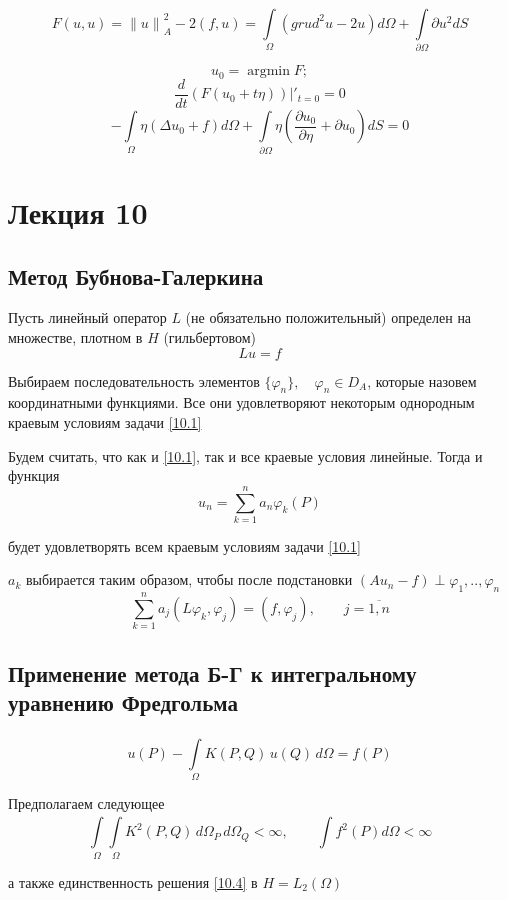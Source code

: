 \documentclass[12pt, a4paper]{article}
\newcommand{\Int}{\int\limits}
\newcommand{\Sum}{\sum\limits}
\begin{document}
\[ F(u,u) = {\|u\|}^2_A - 2(f, u) = \Int_{\Omega}^{} ({grud}^2 u - 2u) d\Omega + \Int_{\partial \Omega}^{} \partial  u^2 dS \]

\[ u_0 = \operatorname{argmin} F; \]
\[ \frac{d}{dt} (F(u_0 + t \eta))|'_{t=0} = 0 \]
\[ -\Int_{\Omega}^{} \eta (\Delta u_0 + f) d\Omega + \Int_{\partial \Omega}^{} \eta (\frac{\partial u_0}{\partial \eta} + \partial u_0) dS = 0 \]

\newpage

\section{Лекция 10}

\subsection{Метод Бубнова-Галеркина}

Пусть линейный оператор $L$ (не обязательно положительный) определен на множестве, плотном в $H$ (гильбертовом)
\[ Lu = f \label{10.1} \tag{10.1} \]

Выбираем последовательность элементов $\{\varphi_n\}, \quad \varphi_n \in D_A $, которые назовем координатными функциями. Все они удовлетворяют некоторым однородным краевым условиям задачи \eqref{10.1}

Будем считать, что как и \eqref{10.1}, так и все краевые условия линейные. Тогда и функция
\[ u_n = \sum_{k=1}^{n}a_n \varphi_k(P) \label{10.2} \tag{10.2} \]

будет удовлетворять всем краевым условиям задачи \eqref{10.1}

$a_k$ выбирается таким образом, чтобы после подстановки $(A u_n - f) \perp \varphi_1, .., \varphi_n $
\[ \Sum_{k=1}^{n} a_j (L\varphi_k, \varphi_j)  = (f, \varphi_j), \qquad j= \overline{1, n} \label{10.3} \tag{10.3} \]

\subsection{Применение метода Б-Г к интегральному уравнению Фредгольма}

\[ u(P) - \Int_{\Omega}^{} K(P, Q) \, u(Q) \, d\Omega = f(P) \label{10.4} \tag{10.4} \]

Предполагаем следующее
\[ \Int_{\Omega}^{}\Int_{\Omega}^{} K^2 (P, Q) \, d\Omega_P \, d\Omega_Q < \infty, \qquad \Int_{}^{}f^2(P) d\Omega < \infty \label{10.5} \tag{10.5} \] 

а также единственность решения \eqref{10.4} в $H=L_2(\Omega)$
\end{document}
